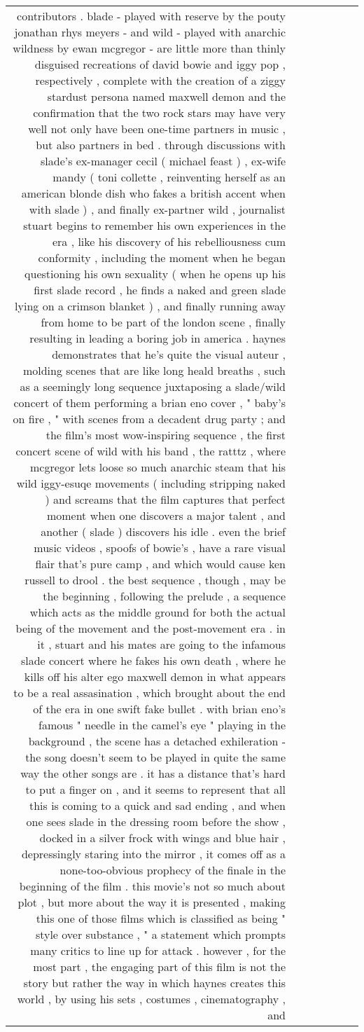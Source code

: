 \begin{tabular}{rlrrrlr}
contributors .  blade - played with reserve by the pouty jonathan rhys meyers - and wild - played with anarchic wildness by ewan mcgregor - are little more than thinly disguised recreations of david bowie and iggy pop , respectively , complete with the creation of a ziggy stardust persona named maxwell demon and the confirmation that the two rock stars may have very well not only have been one-time partners in music , but also partners in bed .  through discussions with slade's ex-manager cecil ( michael feast ) , ex-wife mandy ( toni collette , reinventing herself as an american blonde dish who fakes a british accent when with slade ) , and finally ex-partner wild , journalist stuart begins to remember his own experiences in the era , like his discovery of his rebelliousness cum conformity , including the moment when he began questioning his own sexuality ( when he opens up his first slade record , he finds a naked and green slade lying on a crimson blanket ) , and finally running away from home to be part of the london scene , finally resulting in leading a boring job in america .  haynes demonstrates that he's quite the visual auteur , molding scenes that are like long heald breaths , such as a seemingly long sequence juxtaposing a slade/wild concert of them performing a brian eno cover , " baby's on fire , " with scenes from a decadent drug party ; and the film's most wow-inspiring sequence , the first concert scene of wild with his band , the ratttz , where mcgregor lets loose so much anarchic steam that his wild iggy-esuqe movements ( including stripping naked ) and screams that the film captures that perfect moment when one discovers a major talent , and another ( slade ) discovers his idle .  even the brief music videos , spoofs of bowie's , have a rare visual flair that's pure camp , and which would cause ken russell to drool .  the best sequence , though , may be the beginning , following the prelude , a sequence which acts as the middle ground for both the actual being of the movement and the post-movement era .  in it , stuart and his mates are going to the infamous slade concert where he fakes his own death , where he kills off his alter ego maxwell demon in what appears to be a real assasination , which brought about the end of the era in one swift fake bullet .  with brian eno's famous " needle in the camel's eye " playing in the background , the scene has a detached exhileration - the song doesn't seem to be played in quite the same way the other songs are .  it has a distance that's hard to put a finger on , and it seems to represent that all this is coming to a quick and sad ending , and when one sees slade in the dressing room before the show , docked in a silver frock with wings and blue hair , depressingly staring into the mirror , it comes off as a none-too-obvious prophecy of the finale in the beginning of the film .  this movie's not so much about plot , but more about the way it is presented , making this one of those films which is classified as being " style over substance , " a statement which prompts many critics to line up for attack .  however , for the most part , the engaging part of this film is not the story but rather the way in which haynes creates this world , by using his sets , costumes , cinematography , and 
\end{tabular}
